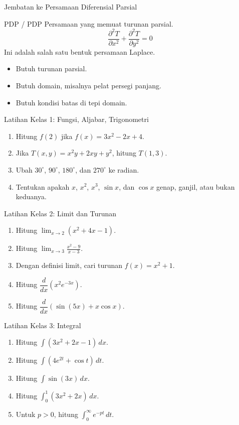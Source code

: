 \documentclass[aspectratio=169,11pt]{beamer}
\begin{document}
\begin{frame}{Jembatan ke Persamaan Diferensial Parsial}
\begin{block}{PDP / PDP}
Persamaan yang memuat turunan parsial.
\[
\frac{\partial^2 T}{\partial x^2}+\frac{\partial^2 T}{\partial y^2}=0
\]
Ini adalah salah satu bentuk persamaan Laplace.
\end{block}
\begin{itemize}
  \item Butuh turunan parsial.
  \item Butuh domain, misalnya pelat persegi panjang.
  \item Butuh kondisi batas di tepi domain.
\end{itemize}
\end{frame}

\begin{frame}{Latihan Kelas 1: Fungsi, Aljabar, Trigonometri}
\small
\begin{enumerate}
  \item Hitung $f(2)$ jika $f(x)=3x^2-2x+4$.
  \item Jika $T(x,y)=x^2y+2xy+y^2$, hitung $T(1,3)$.
  \item Ubah $30^\circ$, $90^\circ$, $180^\circ$, dan $270^\circ$ ke radian.
  \item Tentukan apakah $x$, $x^2$, $x^3$, $\sin x$, dan $\cos x$ genap, ganjil, atau bukan keduanya.
\end{enumerate}
\end{frame}

\begin{frame}{Latihan Kelas 2: Limit dan Turunan}
\small
\begin{enumerate}
  \item Hitung $\displaystyle \lim_{x\to 2}(x^2+4x-1)$.
  \item Hitung $\displaystyle \lim_{x\to 3}\frac{x^2-9}{x-3}$.
  \item Dengan definisi limit, cari turunan $f(x)=x^2+1$.
  \item Hitung $\dfrac{d}{dx}\left(x^2e^{-3x}\right)$.
  \item Hitung $\dfrac{d}{dx}\left(\sin(5x)+x\cos x\right)$.
\end{enumerate}
\end{frame}

\begin{frame}{Latihan Kelas 3: Integral}
\small
\begin{enumerate}
  \item Hitung $\displaystyle \int (3x^2+2x-1)\,dx$.
  \item Hitung $\displaystyle \int \left(4e^{2t}+\cos t\right)\,dt$.
  \item Hitung $\displaystyle \int \sin(3x)\,dx$.
  \item Hitung $\displaystyle \int_0^1 (3x^2+2x)\,dx$.
  \item Untuk $p>0$, hitung $\displaystyle \int_0^\infty e^{-pt}\,dt$.
\end{enumerate}
\end{frame}
\end{document}
